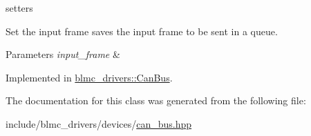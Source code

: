 setters 

Set the input frame saves the input frame to be sent in a queue.


\begin{DoxyParams}{Parameters}
{\em input\+\_\+frame} & \\
\hline
\end{DoxyParams}


Implemented in \hyperlink{classblmc__drivers_1_1CanBus_ae4887644960c0a92fc82f8bdffbe9c48}{blmc\+\_\+drivers\+::\+Can\+Bus}.



The documentation for this class was generated from the following file\+:\begin{DoxyCompactItemize}
\item 
include/blmc\+\_\+drivers/devices/\hyperlink{can__bus_8hpp}{can\+\_\+bus.\+hpp}\end{DoxyCompactItemize}

